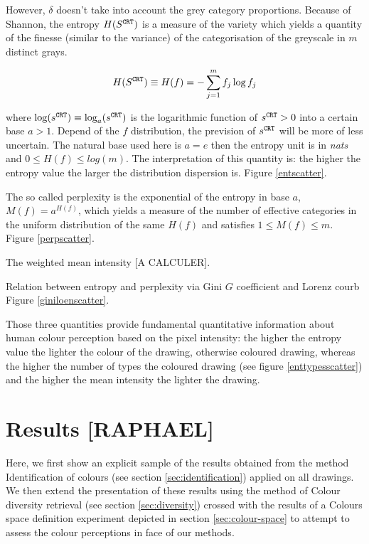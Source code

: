 \documentclass[11pt,a4paper]{article}
\begin{document}
However, \(\delta\) doesn't take into account the grey category
proportions. Because of Shannon, the entropy
\(H(S^{\tt \scriptstyle CRT})\) is a measure of the variety which yields
a quantity of the finesse (similar to the variance) of the
categorisation of the greyscale in \(m\) distinct grays.

\[ H(S^{\tt \scriptstyle CRT}) \equiv H(f) = -\sum_{j=1}^{m} f_j \log f_j \]

where
\(\log(s^{\tt \scriptstyle CRT}) \equiv \log_a(s^{\tt \scriptstyle CRT})\)
is the logarithmic function of \(s^{\tt \scriptstyle CRT} > 0\) into a
certain base \(a > 1\). Depend of the \(f\) distribution, the prevision
of \(s^{\tt \scriptstyle CRT}\) will be more of less uncertain. The
natural base used here is \(a = e\) then the entropy unit is in
\emph{nats} and \(0 \leq H(f) \leq log(m)\). The interpretation of this
quantity is: the higher the entropy value the larger the distribution
dispersion is. Figure \ref{entscatter}.

The so called perplexity is the exponential of the entropy in base
\(a\), \(M(f) = a^{H(f)}\), which yields a measure of the number of
effective categories in the uniform distribution of the same \(H(f)\)
and satisfies \(1 \leq M(f) \leq m\). Figure \ref{perpscatter}.

The weighted mean intensity {[}A CALCULER{]}.

Relation between entropy and perplexity via Gini \(G\) coefficient and
Lorenz courb Figure \ref{giniloenscatter}.

Those three quantities provide fundamental quantitative information
about human colour perception based on the pixel intensity: the higher
the entropy value the lighter the colour of the drawing, otherwise
coloured drawing, whereas the higher the number of types the coloured
drawing (see figure \ref{enttypesscatter}) and the higher the mean
intensity the lighter the drawing.



\section{Results [RAPHAEL]}

Here, we first show an explicit sample of the results obtained from the method Identification of colours (see section \ref{sec:identification}) applied on all drawings. We then extend the presentation of these results using the method of Colour diversity retrieval (see section \ref{sec:diversity}) crossed with the results of a Colours space definition experiment depicted in section  \ref{sec:colour-space} to attempt to assess the colour perceptions in face of our methods.
\end{document}
